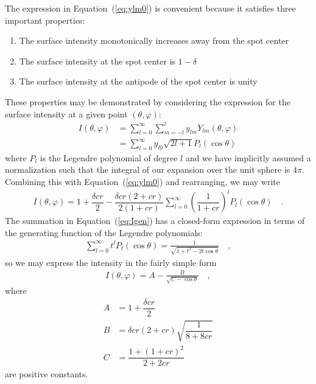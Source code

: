 \documentclass[modern]{aastex62}
\begin{document}
The expression in Equation~(\ref{eq:ylm0}) is convenient because it satisfies
three important properties:
%
\begin{enumerate}[itemsep=2pt,parsep=1pt,label=\textbf{\arabic*}]
    \item The surface intensity monotonically increases away from the spot center
    \item The surface intensity at the spot center is $1 - \delta$
    \item The surface intensity at the antipode of the spot center is unity
\end{enumerate}
%
These properties may be demonstrated by considering the expression for the
surface intensity at a given point $(\theta, \varphi)$:
%
\begin{align}
    I(\theta, \varphi)
     & =
    \sum\limits_{l=0}^\infty \sum\limits_{m=-l}^l
    y_{lm} Y_{lm}(\theta, \varphi) \\
     & = \sum\limits_{l=0}^\infty
    y_{l0} \sqrt{2l + 1} P_l(\cos\theta)
\end{align}
%
where $P_l$ is the Legendre polynomial of degree $l$ and we have implicitly
assumed a normalization such that the integral of our expansion over
the unit sphere is $4\pi$.
Combining this with Equation~(\ref{eq:ylm0}) and rearranging, we may write
%
\begin{align}
    \label{eq:Igen}
    I(\theta, \varphi) =
    1 + \dfrac{\delta c r}{2}
    -
    \dfrac{\delta c r \left( 2 + c r \right)}{2 (1 + c r)}
    \sum\limits_{l=0}^\infty \left(\dfrac{1}{1 + c r}\right)^l P_l(\cos\theta)
    \quad.
\end{align}
%
The summation in Equation~(\ref{eq:Igen}) has a closed-form expression in
terms of the generating function of the Legendre polynomials:
%
\begin{align}
    \label{eq:gen}
    \sum\limits_{l=0}^\infty t^l P_l(\cos\theta) = \frac{1}{\sqrt{1 + t^2 - 2 t \cos\theta}}
    \quad,
\end{align}
%
so we may express the intensity in the fairly simple form
%
\begin{align}
    \label{eq:Ifinal}
    I(\theta, \varphi) = A - \frac{B}{\sqrt{C - \cos\theta}}
    \quad,
\end{align}
%
where
%
\begin{align}
    A & = 1 + \dfrac{\delta c r}{2}                      \\
    B & = \delta c r (2 + cr) \sqrt{\dfrac{1}{8 + 8 cr}} \\
    C & = \dfrac{1 + (1 + c r)^2}{2 + 2 c r}
\end{align}
%
are positive constants.
\end{document}
